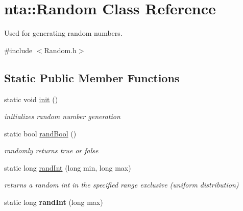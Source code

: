 \hypertarget{classnta_1_1Random}{}\section{nta\+:\+:Random Class Reference}
\label{classnta_1_1Random}


Used for generating random numbers.  




{\ttfamily \#include $<$Random.\+h$>$}

\subsection*{Static Public Member Functions}
\begin{DoxyCompactItemize}
\item 
\mbox{\label{classnta_1_1Random_ac310b6b657b1bdb78795d529c48f537f}} 
static void \hyperlink{classnta_1_1Random_ac310b6b657b1bdb78795d529c48f537f}{init} ()
\begin{DoxyCompactList}\small\item\em initializes random number generation \end{DoxyCompactList}\item 
\mbox{\label{classnta_1_1Random_a5cde49f2ac5cbd8d9d9844dbe7644759}} 
static bool \hyperlink{classnta_1_1Random_a5cde49f2ac5cbd8d9d9844dbe7644759}{rand\+Bool} ()
\begin{DoxyCompactList}\small\item\em randomly returns true or false \end{DoxyCompactList}\item 
\mbox{\label{classnta_1_1Random_aee5fa8d97f0cf1ccee84c6270b42a50d}} 
static long \hyperlink{classnta_1_1Random_aee5fa8d97f0cf1ccee84c6270b42a50d}{rand\+Int} (long min, long max)
\begin{DoxyCompactList}\small\item\em returns a random int in the specified range exclusive (uniform distribution) \end{DoxyCompactList}\item 
\mbox{\label{classnta_1_1Random_aa4bbbb087b7651836f53b515ffb154ad}} 
static long {\bfseries rand\+Int} (long max)
\item 

\end{DoxyCompactItemize}
